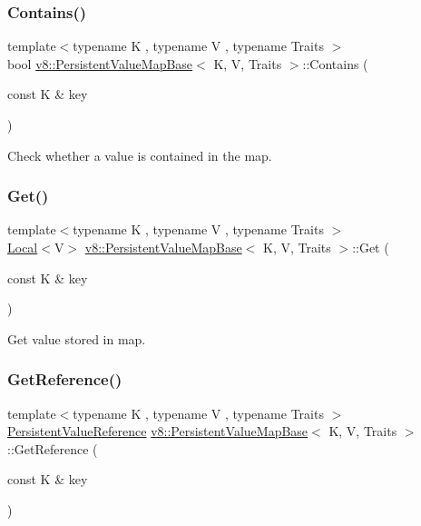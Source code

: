 \subsubsection{\texorpdfstring{Contains()}{Contains()}}
{\footnotesize\ttfamily template$<$typename K , typename V , typename Traits $>$ \\
bool \mbox{\hyperlink{classv8_1_1PersistentValueMapBase}{v8\+::\+Persistent\+Value\+Map\+Base}}$<$ K, V, Traits $>$\+::Contains (\begin{DoxyParamCaption}\item[{const K \&}]{key }\end{DoxyParamCaption})\hspace{0.3cm}{\ttfamily [inline]}}

Check whether a value is contained in the map. \mbox{\label{classv8_1_1PersistentValueMapBase_a16b8f906ea42036c2f37d44813bf2a72}} 
\subsubsection{\texorpdfstring{Get()}{Get()}}
{\footnotesize\ttfamily template$<$typename K , typename V , typename Traits $>$ \\
\mbox{\hyperlink{classv8_1_1Local}{Local}}$<$V$>$ \mbox{\hyperlink{classv8_1_1PersistentValueMapBase}{v8\+::\+Persistent\+Value\+Map\+Base}}$<$ K, V, Traits $>$\+::Get (\begin{DoxyParamCaption}\item[{const K \&}]{key }\end{DoxyParamCaption})\hspace{0.3cm}{\ttfamily [inline]}}

Get value stored in map. \mbox{\label{classv8_1_1PersistentValueMapBase_a52e74c69b94c7ce77a65af9f32d68af4}} 
\subsubsection{\texorpdfstring{Get\+Reference()}{GetReference()}}
{\footnotesize\ttfamily template$<$typename K , typename V , typename Traits $>$ \\
\mbox{\hyperlink{classv8_1_1PersistentValueMapBase_1_1PersistentValueReference}{Persistent\+Value\+Reference}} \mbox{\hyperlink{classv8_1_1PersistentValueMapBase}{v8\+::\+Persistent\+Value\+Map\+Base}}$<$ K, V, Traits $>$\+::Get\+Reference (\begin{DoxyParamCaption}\item[{const K \&}]{key }\end{DoxyParamCaption})\hspace{0.3cm}{\ttfamily [inline]}}

